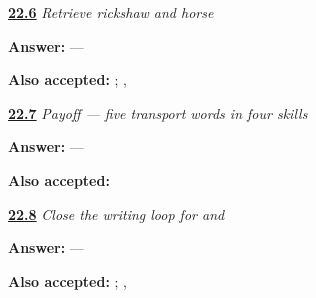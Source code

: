 \noindent\begin{minipage}[t]{\linewidth}
\raggedright
\hyperlink{review-MW-R17-transport-new-two-recall}{\textbf{22.6}} \emph{Retrieve rickshaw and horse}\par
\small \textbf{Answer:}  — \par
\footnotesize \textbf{Also accepted:}  ; , 
\end{minipage}\par\medskip

\noindent\begin{minipage}[t]{\linewidth}
\raggedright
\hyperlink{review-MW-C17-transport-five-payoff}{\textbf{22.7}} \emph{Payoff — five transport words in four skills}\par
\small \textbf{Answer:}  — \par
\footnotesize \textbf{Also accepted:}  
\end{minipage}\par\medskip

\noindent\begin{minipage}[t]{\linewidth}
\raggedright
\hyperlink{review-MW-R17-script-close-recall}{\textbf{22.8}} \emph{Close the writing loop for  and }\par
\small \textbf{Answer:}  — \par
\footnotesize \textbf{Also accepted:}  ; , 
\end{minipage}\par\medskip
